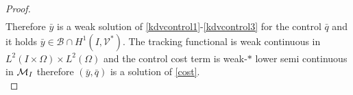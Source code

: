 \begin{proof}
\begin{multline*}
\end{multline*}
Therefore $\bar y$ is a weak solution of \eqref{kdvcontrol1}-\eqref{kdvcontrol3} for the control $\bar q$ and it holds $\bar y\in \mathcal B\cap H^1(I,\mathcal V^*)$.
The tracking functional is weak continuous in $L^2(I\times \Omega)\times L^2(\Omega)$ and the control cost term is weak-$*$ lower semi continuous in $\mathcal{M}_I$ therefore $(\bar y,\bar q)$ is a solution of \eqref{cost}.\\

\end{proof}
